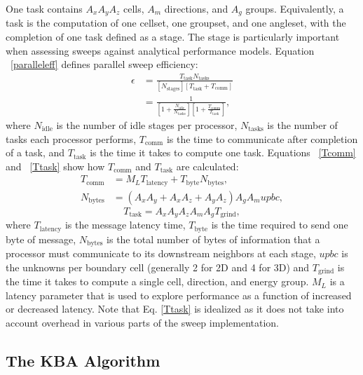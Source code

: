 \documentclass[times,final]{elsarticle}
\begin{document}
One task contains $A_x A_y A_z$ cells, $A_m$ directions, and $A_g$ groups.
Equivalently, a task is the computation of one cellset, one groupset, and one angleset, with the completion of one task defined as a stage.
The stage is particularly important when assessing sweeps against analytical performance models.
Equation ~\ref{paralleleff} defines parallel sweep efficiency:
\begin{equation}\label{paralleleff}
\begin{split}
\epsilon &= \frac{T_{\text{task}} N_{\text{tasks}}}{[N_{\text{stages}}] [T_{\text{task}} + T_{\text{comm}}]} \\
            &=\frac{1}{[1+\frac{N_{\text{idle}}}{N_{\text{tasks}}}][1 + \frac{T_{\text{comm}}}{T_{\text{task}}}]},
\end{split}
\end{equation}
where $N_\text{idle}$ is the number of idle stages per processor, $N_\text{tasks}$ is the number of tasks each processor performs, $T_\text{comm}$ is the time to communicate after completion of a task, and $T_\text{task}$ is the time it takes to compute one task.
Equations ~\ref{Tcomm} and ~\ref{Ttask} show how $T_{\text{comm}}$ and $T_{\text{task}}$ are calculated:
\begin{align}
T_{\text{comm}} &= M_L T_{\text{latency}} + T_{\text{byte}} N_{\text{bytes}}, \\
N_{\text{bytes}} &= (A_x A_y + A_x A_z + A_y A_z)A_g A_m upbc,
\label{Tcomm}
\end{align}
\begin{equation}
T_{\text{task}} = A_x A_y A_z A_m A_g T_{\text{grind}},
\label{Ttask}
\end{equation}
where $T_{\text{latency}}$ is the message latency time, $T_{\text{byte}}$ is the time required to send one byte of message, $N_{\text{bytes}}$ is the total number of bytes of information that a processor must communicate to its downstream neighbors at each stage, $upbc$ is the unknowns per boundary cell (generally 2 for 2D and 4 for 3D) and $T_{\text{grind}}$ is the time it takes to compute a single cell, direction, and energy group.
$M_L$ is a latency parameter that is used to explore performance as a function of increased or decreased latency.
Note that Eq. \ref{Ttask} is idealized as it does not take into account overhead in various parts of the sweep implementation.

\subsection{The KBA Algorithm}\label{sec:KBA}
\end{document}
